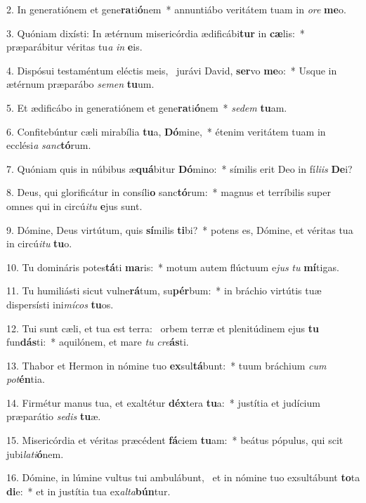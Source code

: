 2. In generatiónem et gene\textbf{ra}ti\textbf{ó}nem~*  annuntiábo veritátem tuam in \textit{o}\textit{re} \textbf{me}o.\

3. Quóniam dixísti: In ætérnum misericórdia ædificábi\textbf{tur} in \textbf{cæ}lis:~*  præparábitur véritas tu\textit{a} \textit{in} \textbf{e}is.\

4. Dispósui testaméntum eléctis meis, \dag\  jurávi David, \textbf{ser}vo \textbf{me}o:~*  Usque in ætérnum præparábo \textit{se}\textit{men} \textbf{tu}um.\

5. Et ædificábo in generatiónem et gene\textbf{ra}ti\textbf{ó}nem~*  \textit{se}\textit{dem} \textbf{tu}am.\

6. Confitebúntur cæli mirabília \textbf{tu}a, \textbf{Dó}mine,~*  étenim veritátem tuam in ecclési\textit{a} \textit{sanc}\textbf{tó}rum.\

7. Quóniam quis in núbibus æ\textbf{quá}bitur \textbf{Dó}mino:~*  símilis erit Deo in fí\textit{li}\textit{is} \textbf{De}i?\

8. Deus, qui glorificátur in consíli\textbf{o} sanc\textbf{tó}rum:~*  magnus et terríbilis super omnes qui in circú\textit{i}\textit{tu} \textbf{e}jus sunt.\

9. Dómine, Deus virtútum, quis \textbf{sí}milis \textbf{ti}bi?~*  potens es, Dómine, et véritas tua in circú\textit{i}\textit{tu} \textbf{tu}o.\

10. Tu domináris potes\textbf{tá}ti \textbf{ma}ris:~*  motum autem flúctuum e\textit{jus} \textit{tu} \textbf{mí}tigas.\

11. Tu humiliásti sicut vulne\textbf{rá}tum, su\textbf{pér}bum:~*  in bráchio virtútis tuæ dispersísti ini\textit{mí}\textit{cos} \textbf{tu}os.\

12. Tui sunt cæli, et tua est terra: \dag\  orbem terræ et plenitúdinem ejus \textbf{tu} fun\textbf{dás}ti:~*  aquilónem, et mare \textit{tu} \textit{cre}\textbf{ás}ti.\

13. Thabor et Hermon in nómine tuo \textbf{ex}sul\textbf{tá}bunt:~*  tuum bráchium \textit{cum} \textit{pot}\textbf{én}tia.\

14. Firmétur manus tua, et exaltétur \textbf{déx}tera \textbf{tu}a:~*  justítia et judícium præparátio \textit{se}\textit{dis} \textbf{tu}æ.\

15. Misericórdia et véritas præcédent \textbf{fá}ciem \textbf{tu}am:~*  beátus pópulus, qui scit jubi\textit{la}\textit{ti}\textbf{ó}nem.\

16. Dómine, in lúmine vultus tui ambulábunt, \dag\  et in nómine tuo exsultábunt \textbf{to}ta \textbf{di}e:~*  et in justítia tua ex\textit{al}\textit{ta}\textbf{bún}tur.\

